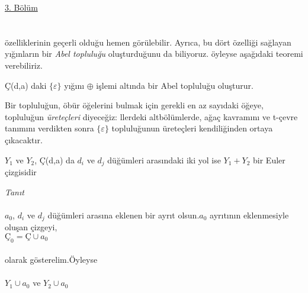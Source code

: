 \documentclass[11pt]{amsbook}
\begin{document}
\underline{3. Bölüm\hspace*{70ex} }\\ \\ \\

özelliklerinin geçerli olduğu hemen görülebilir.
Ayrıca, bu dört özelliği sağlayan yığınların bir
\textit{Abel topluluğu} oluşturduğunu da biliyoruz. öyleyse
aşağıdaki teoremi verebiliriz. 

\begin{theorem}
 	\normalfont Ç(d,a)  daki $ \{\varepsilon\} $ yığını $\oplus$  işlemi altında bir Abel topluluğu oluşturur.
	\end{theorem}
Bir topluluğun, öbür öğelerini bulmak için gerekli
en az sayıdaki öğeye, topluluğun \textit{üreteçleri}
diyeceğiz: llerdeki altbölümlerde, ağaç kavramını
ve t-çevre tanımını verdikten sonra $ \{\varepsilon\} $
topluluğunun üreteçleri kendiliğinden ortaya
çıkacaktır. 

\begin{theorem}
\normalfont	$Y_1$ ve $Y_2$, Ç(d,a) da $d_i$ ve $d_j$ düğümleri arasındaki iki yol ise $Y_1 + Y_2$ bir Euler çizgisidir
\end{theorem}

\textit{Tanıt}\\ \\
$a_0$, $d_i$ ve $d_j$ düğümleri arasına eklenen bir ayrıt olsun.$a_0$ ayrıtının eklenmesiyle oluşan çizgeyi,\\

\hspace*{12ex} $Ç_0 = Ç \cup a_0 $\\\\
olarak gösterelim.Öyleyse\\\\
\hspace*{12ex} $Y_1 \cup a_0 $  \qquad      ve     \qquad    $Y_2 \cup a_0 $ 
\end{document}
